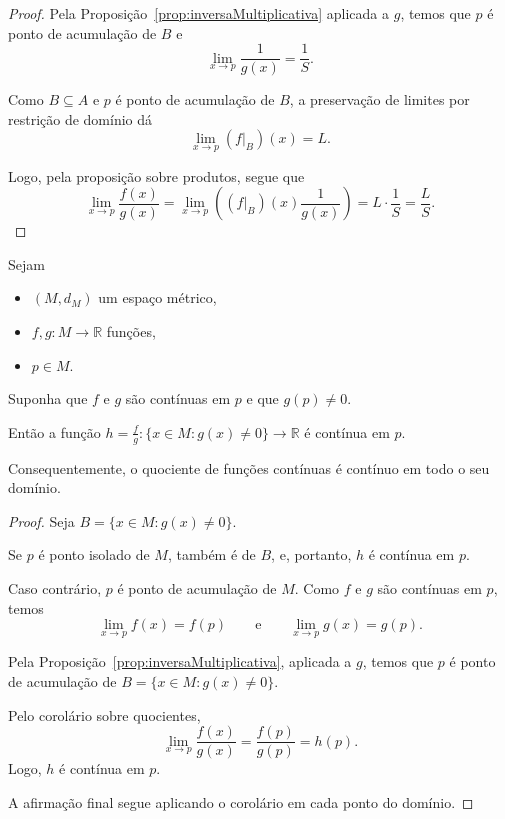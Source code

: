 \begin{proof}
    Pela Proposição~\ref{prop:inversaMultiplicativa} aplicada a $g$, temos que $p$ é ponto de acumulação de $B$ e
    \[
        \lim_{x\to p}\frac{1}{g(x)}=\frac{1}{S}.
    \]

    Como $B\subseteq A$ e $p$ é ponto de acumulação de $B$, a preservação de limites por restrição de domínio dá
    \[
        \lim_{x\to p}(f|_B)(x)=L.
    \]

    Logo, pela proposição sobre produtos, segue que
    \[
        \lim_{x\to p}\frac{f(x)}{g(x)}
        =
        \lim_{x\to p}\left((f|_B)(x)\frac{1}{g(x)}\right)
        =
        L\cdot\frac{1}{S}
        =
        \frac{L}{S}.
    \]
\end{proof}

\begin{corollary}
    Sejam
    \begin{itemize}
        \item $(M,d_M)$ um espaço métrico,
        \item $f,g:M\to\mathbb R$ funções,
        \item $p\in M$.
    \end{itemize}

    Suponha que $f$ e $g$ são contínuas em $p$ e que $g(p)\neq 0$.

    Então a função $h=\frac{f}{g}:\{x\in M:g(x)\neq 0\}\to\mathbb R$ é contínua em $p$.
    
    Consequentemente, o quociente de funções contínuas é contínuo em todo o seu domínio.
\end{corollary}

\begin{proof}
    Seja $B=\{x\in M:g(x)\neq 0\}$.

    Se $p$ é ponto isolado de $M$, também é de $B$, e, portanto, $h$ é contínua em $p$.

    Caso contrário, $p$ é ponto de acumulação de $M$.
    Como $f$ e $g$ são contínuas em $p$, temos
    \[
        \lim_{x\to p}f(x)=f(p)
        \qquad\text{e}\qquad
        \lim_{x\to p}g(x)=g(p).
    \]

    Pela Proposição~\ref{prop:inversaMultiplicativa}, aplicada a $g$, temos que $p$ é ponto de acumulação de $B=\{x\in M:g(x)\neq 0\}$.

    Pelo corolário sobre quocientes,
    \[
        \lim_{x\to p}\frac{f(x)}{g(x)}=\frac{f(p)}{g(p)}=h(p).
    \]
    Logo, $h$ é contínua em $p$.

    A afirmação final segue aplicando o corolário em cada ponto do domínio.
\end{proof}

